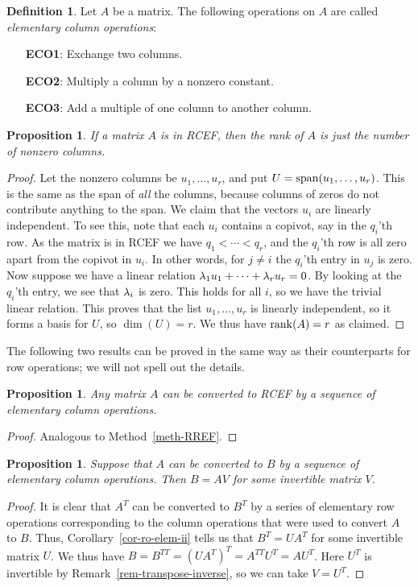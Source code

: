 \documentclass[reqno]{amsart}
\newtheorem{proposition}[theorem]{Proposition}
\theoremstyle{definition}
\newtheorem{definition}[theorem]{Definition}
\begin{document}
\begin{definition}\label{defn-ECO}
 Let $A$ be a matrix.  The following operations on $A$ are called
 \emph{elementary column operations}:
 \begin{itemize}
  \item[\textbf{ECO1}:] Exchange two columns.
  \item[\textbf{ECO2}:] Multiply a column by a nonzero constant.
  \item[\textbf{ECO3}:] Add a multiple of one column to another column.
 \end{itemize}
\end{definition}

\begin{proposition}\label{prop-rank-rcef}
 If a matrix $A$ is in RCEF, then the rank of $A$ is just the number
 of nonzero columns.
\end{proposition}
\begin{proof}
 Let the nonzero columns be $u_1,\dotsc,u_r$, and put
 $U=\operatorname{span}(u_1,\dotsc,u_r)$.  This is the same as the span of \emph{all}
 the columns, because columns of zeros do not contribute anything to
 the span.  We claim that the vectors $u_i$ are linearly independent.
 To see this, note that each $u_i$ contains a copivot, say in the
 $q_i$'th row.  As the matrix is in RCEF we have $q_1<\dotsb<q_r$, and
 the $q_i$'th row is all zero apart from the copivot in $u_i$.  In
 other words, for $j\neq i$ the $q_i$'th entry in $u_j$ is zero.  Now
 suppose we have a linear relation $\lambda_1u_1+\dotsb+\lambda_ru_r=0$.  By
 looking at the $q_i$'th entry, we see that $\lambda_i$ is zero.  This
 holds for all $i$, so we have the trivial linear relation.  This
 proves that the list $u_1,\dotsc,u_r$ is linearly independent, so it
 forms a basis for $U$, so $\dim(U)=r$.  We thus have $\operatorname{rank}(A)=r$ as
 claimed. 
\end{proof}

The following two results can be proved in the same way as their
counterparts for row operations; we will not spell out the details.
\begin{proposition}\label{prop-RCEF}
 Any matrix $A$ can be converted to RCEF by a sequence of elementary
 column operations.
\end{proposition}
\begin{proof}
 Analogous to Method~\ref{meth-RREF}.
\end{proof}

\begin{proposition}\label{cor-co-elem}
 Suppose that $A$ can be converted to $B$ by a sequence of elementary
 column operations.  Then $B=AV$ for some invertible matrix $V$.
\end{proposition}
\begin{proof}
 It is clear that $A^T$ can be converted to $B^T$ by a series of
 elementary row operations corresponding to the column operations that
 were used to convert $A$ to $B$.  Thus,
 Corollary~\ref{cor-ro-elem-ii} tells us that $B^T=UA^T$ for some
 invertible matrix $U$.  We thus have
 $B=B^{TT}=(UA^T)^T=A^{TT}U^T=AU^T$.  Here $U^T$ is invertible by
 Remark~\ref{rem-transpose-inverse}, so we can take $V=U^T$.
\end{proof}
\end{document}
